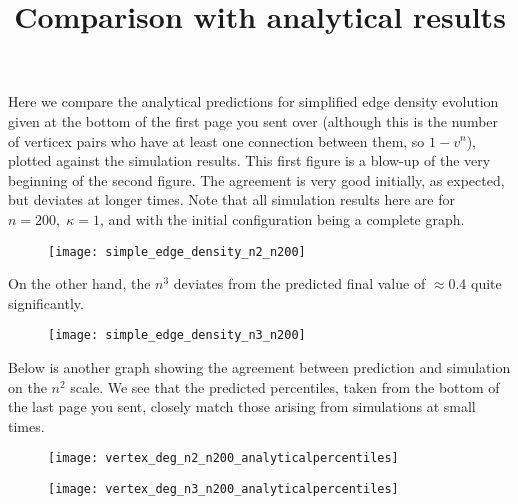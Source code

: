 \documentclass[11pt]{article}
\begin{document}
\title{\vspace{-5mm}Comparison with analytical results}
\author{}
\date{}
\maketitle
\vspace{-15mm}
Here we compare the analytical predictions for simplified edge density evolution given at the bottom of the first page you sent over (although this is the number of verticex pairs who have at least one connection between them, so $1-v^n$), plotted against the simulation results. This first figure is a blow-up of the very beginning of the second figure. The agreement is very good initially, as expected, but deviates at longer times. Note that all simulation results here are for $n=200, \; \kappa = 1$, and with the initial configuration being a complete graph. \\

\begin{center}
\begin{figure}[h!]
  \vspace{-7mm}
  \texttt{[image: simple\_edge\_density\_n2\_n200]}
\end{figure}

On the other hand, the $n^3$ deviates from the predicted final value of $\approx 0.4$ quite significantly.

\centering
\begin{figure}[h!]
  \vspace{-3mm}
  \texttt{[image: simple\_edge\_density\_n3\_n200]}
\end{figure}
\end{center}

\pagebreak

Below is another graph showing the agreement between prediction and simulation on the $n^2$ scale. We see that the predicted percentiles, taken from the bottom of the last page you sent, closely match those arising from simulations at small times.

\begin{figure}[h!]
  \vspace{-0mm}
  \texttt{[image: vertex\_deg\_n2\_n200\_analyticalpercentiles]}
\end{figure}



\centering
\begin{figure}[h!]
  \texttt{[image: vertex\_deg\_n3\_n200\_analyticalpercentiles]}
\end{figure}

\clearpage
\end{document}
